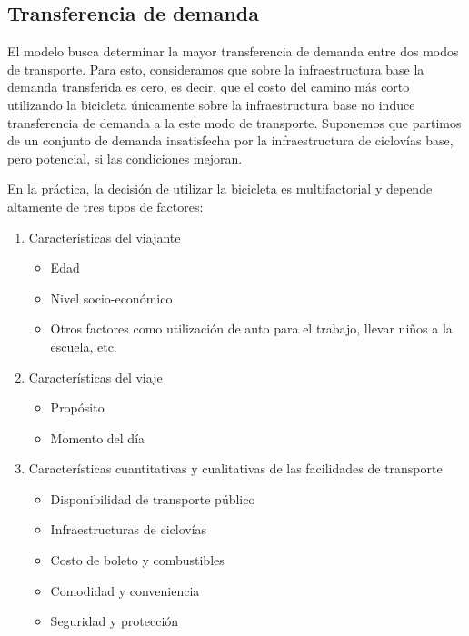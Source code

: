 \documentclass{article}
\begin{document}
  \subsection{Transferencia de demanda}

  El modelo busca determinar la mayor transferencia de demanda entre dos modos de transporte. Para esto, consideramos que sobre la infraestructura base la demanda transferida es cero, es decir, que el costo del camino más corto utilizando la bicicleta únicamente sobre la infraestructura base no induce transferencia de demanda a la este modo de transporte. Suponemos que partimos de un conjunto de demanda insatisfecha por la infraestructura de ciclovías base, pero potencial, si las condiciones mejoran.

  En la práctica, la decisión de utilizar la bicicleta es multifactorial y depende altamente de tres tipos de factores:

  \begin{enumerate}
    \item{
        Características del viajante
          \begin{itemize}
            \item{Edad}
            \item{Nivel socio-económico}
            \item{Otros factores como utilización de auto para el trabajo, llevar niños a la escuela, etc.}
          \end{itemize}
    }
    \item{
        Características del viaje
          \begin{itemize}
            \item{Propósito}
            \item{Momento del día}
          \end{itemize}
    }
    \item{
        Características cuantitativas y cualitativas de las facilidades de transporte
        \begin{itemize}
            \item{Disponibilidad de transporte público}
            \item{Infraestructuras de ciclovías}
            \item{Costo de boleto y combustibles}
            \item{Comodidad y conveniencia}
            \item{Seguridad y protección}
        \end{itemize}
    }
  \end{enumerate}
\end{document}

